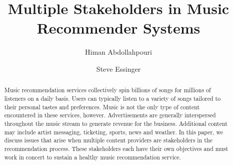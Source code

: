 \documentclass[sigconf]{acmart}
\begin{document}
\title{Multiple Stakeholders in Music Recommender Systems}

\author{Himan Abdollahpouri}

\author{Steve Essinger}



\begin{abstract}
    Music recommendation services collectively spin billions of songs for millions of listeners on a daily basis. Users can typically listen to a variety of songs tailored to their personal tastes and preferences. Music is not the only type of content encountered in these services, however. Advertisements are generally interspersed throughout the music stream to generate revenue for the business. Additional content may include artist messaging, ticketing, sports, news and weather. In this paper, we discuss issues that arise when multiple content providers are stakeholders in the recommendation process. These stakeholders each have their own objectives and must work in concert to sustain a healthy music recommendation service.
\end{abstract}

%
%

\keywords{}


\maketitle



%
% 
\end{document}
